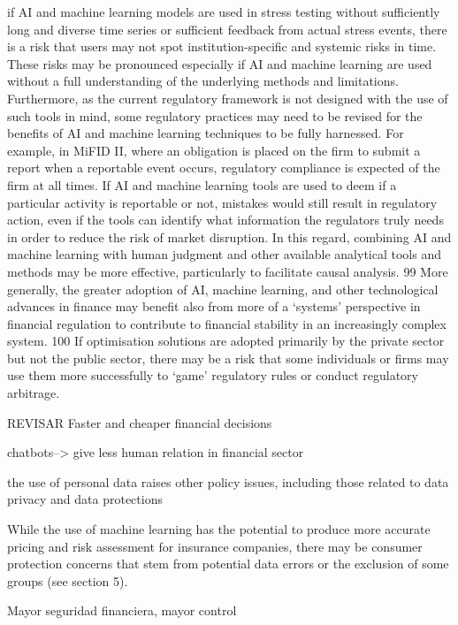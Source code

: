 \documentclass[]{article}
\begin{document}
if AI and machine learning models are used in stress testing without
sufficiently long and diverse time series or sufficient feedback from
actual stress events, there is a risk that users may not spot
institution-specific and systemic risks in time. These risks may be
pronounced especially if AI and machine learning are used without a full
understanding of the underlying methods and limitations. Furthermore, as
the current regulatory framework is not designed with the use of such
tools in mind, some regulatory practices may need to be revised for the
benefits of AI and machine learning techniques to be fully harnessed.
For example, in MiFID II, where an obligation is placed on the firm to
submit a report when a reportable event occurs, regulatory compliance is
expected of the firm at all times. If AI and machine learning tools are
used to deem if a particular activity is reportable or not, mistakes
would still result in regulatory action, even if the tools can identify
what information the regulators truly needs in order to reduce the risk
of market disruption. In this regard, combining AI and machine learning
with human judgment and other available analytical tools and methods may
be more effective, particularly to facilitate causal analysis. 99 More
generally, the greater adoption of AI, machine learning, and other
technological advances in finance may benefit also from more of a
`systems' perspective in financial regulation to contribute to financial
stability in an increasingly complex system. 100 If optimisation
solutions are adopted primarily by the private sector but not the public
sector, there may be a risk that some individuals or firms may use them
more successfully to `game' regulatory rules or conduct regulatory
arbitrage.

REVISAR Faster and cheaper financial decisions

chatbots--\textgreater{} give less human relation in financial sector

the use of personal data raises other policy issues, including those
related to data privacy and data protections

While the use of machine learning has the potential to produce more
accurate pricing and risk assessment for insurance companies, there may
be consumer protection concerns that stem from potential data errors or
the exclusion of some groups (see section 5).

Mayor seguridad financiera, mayor control
\end{document}
